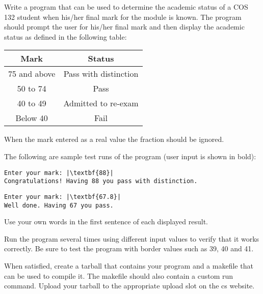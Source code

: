 \documentclass [a4paper,leqno, 12pt] {article}
\begin{document}
Write a program that can be used to determine the academic status of a COS 132 student when his/her final mark for the module is known. The program should prompt the user for his/her final mark and then display the academic status as defined in the following table:
\begin{center}
\begin{tabular}{c|c}
\textbf{Mark}&\textbf{Status} \\
\hline
75 and above & Pass with distinction \\
50 to 74 & Pass \\
40 to 49 & Admitted to re-exam \\
Below 40 & Fail \\ 
\end{tabular}
\end{center}
 
When the mark entered as a real value the fraction should be ignored.

The following are sample test runs of the  program (user input is shown in bold):   
\begin{lstlisting}
Enter your mark: |\textbf{88}|
Congratulations! Having 88 you pass with distinction.
\end{lstlisting}

\begin{lstlisting}
Enter your mark: |\textbf{67.8}|
Well done. Having 67 you pass.
\end{lstlisting}

Use your own words in the first sentence of each displayed result.

Run the program several times using different input values to verify that it works correctly. Be sure to test the program with border values such as 39, 40 and 41.

When satisfied, create a tarball that contains your program and a makefile that can be used to compile it. The makefile should also contain a custom run command. Upload your tarball to the appropriate upload slot on the cs website.
\end{document}
